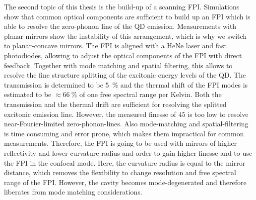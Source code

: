 The second topic of this thesis is the build-up of a scanning \ac{FPI}.
Simulations show that common optical components are sufficient to build up an \ac{FPI} which is able to resolve the zero-phonon line of the \ac{QD} emission.
Measurements with planar mirrors show the instability of this arrangement, which is why we switch to planar-concave mirrors.
The \ac{FPI} is aligned with a HeNe laser and fast photodiodes, allowing to adjust the optical components of the \ac{FPI} with direct feedback.
Together with mode matching and spatial filtering, this allows to resolve the fine structure splitting of the excitonic energy levels of the \ac{QD}.
The transmission is determined to be \SI{5}{\percent} and the thermal shift of the \ac{FPI} modes is estimated to be $\approx \SI{66}{\percent}$ of one free spectral range per Kelvin.
Both the transmission and the thermal drift are sufficient for resolving the splitted excitonic emission line. However, the measured finesse of $45$ is too low to resolve near-Fourier-limited zero-phonon-lines.
Also mode-matching and spatial-filtering is time consuming and error prone, which makes them impractical for common measurements.
Therefore, the \ac{FPI} is going to be used with mirrors of higher reflectivity and lower curvature radius and order to gain higher finesse and to use the \ac{FPI} in the confocal mode.
Here, the curvature radius is equal to the mirror distance, which removes the flexibility to change resolution and free spectral range of the \ac{FPI}.
However, the cavity becomes mode-degenerated and therefore liberates from mode matching considerations.

